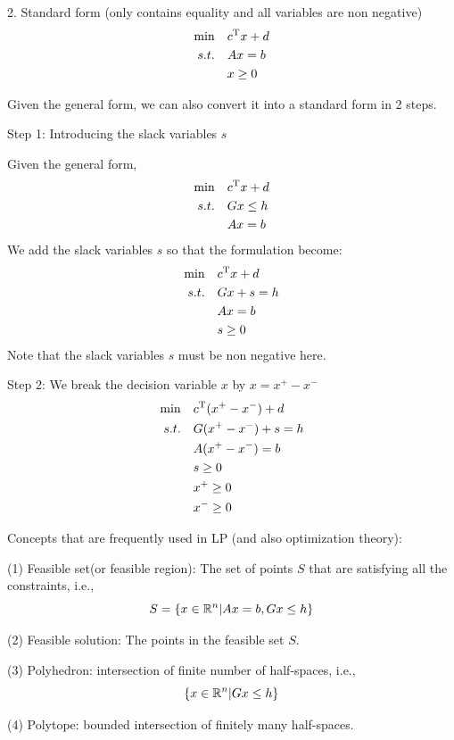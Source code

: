2. Standard form (only contains equality and all variables are non negative)
\begin{align*}
	\min \quad&c^{{\rm T}}x+d\\
	s.t. \quad&Ax = b\\
	&x\geq 0
\end{align*}

Given the general form, we can also convert it into a standard form in 2 steps.

Step 1: Introducing the slack variables $s$

Given the general form,
\begin{align*}
	\min \quad&c^{{\rm T}}x+d\\
	s.t. \quad&Gx\leq h\\
	&Ax = b
\end{align*}
We add the slack variables $s$ so that the formulation become:
\begin{align*}
	\min \quad&c^{{\rm T}}x+d\\
	s.t. \quad&Gx + s = h\\
	&Ax = b\\
	&s\geq 0
\end{align*}
Note that the slack variables $s$ must be non negative here.


Step 2: We break the decision variable $x$ by $x= x^+ - x^-$
\begin{align*}
	\min \quad &c^{{\rm T}}(x^{+} - x^{-})+d\\
	s.t. \quad&G(x^{+} - x^{-}) + s = h\\
	&A(x^{+} - x^{-}) = b\\
	&s\geq 0\\
	&x^{+}\geq 0\\
	&x^{-}\geq 0
\end{align*}


Concepts that are frequently used in LP (and also optimization theory):

(1) Feasible set(or feasible region): The set of points $S$ that are satisfying all the constraints, i.e.,
$$S = \{x\in\mathbb{R}^{n}|Ax = b, Gx \leq h \}$$

(2) Feasible solution: The points in the feasible set $S$.

(3) Polyhedron: intersection of finite number of half-spaces, i.e.,
$$\{x\in\mathbb{R}^{n}|Gx\leq h\}$$

(4) Polytope: bounded intersection of finitely many half-spaces.





